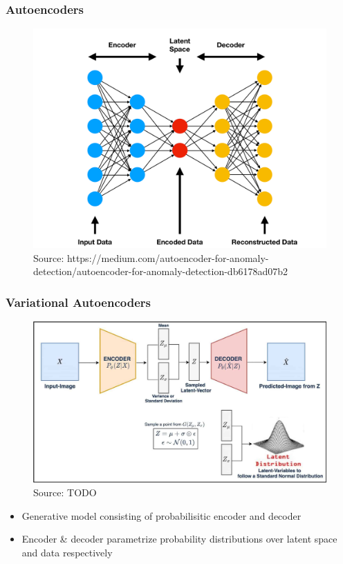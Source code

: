\documentclass{beamer}
\theoremstyle{definition}
\begin{document}
    \begin{frame}
      \frametitle{Autoencoders}
      \begin{figure}
        \includegraphics[scale= 0.09]{Autoencoder_illustration.png}
        \caption*{Source: https://medium.com/autoencoder-for-anomaly-detection/autoencoder-for-anomaly-detection-db6178ad07b2}
      \end{figure}

    \end{frame}
    \begin{frame}
      \frametitle{Variational Autoencoders}
      \begin{figure}
        \includegraphics[scale=.125]{vae-diagram.jpg}
        \caption{Source: TODO}
      \end{figure}
      \vspace{-5mm}
      \begin{itemize}
        \item Generative model consisting of probabilisitic encoder and decoder
        \item Encoder \& decoder parametrize probability distributions over latent space and data respectively
      \end{itemize}

    \end{frame}
\end{document}

